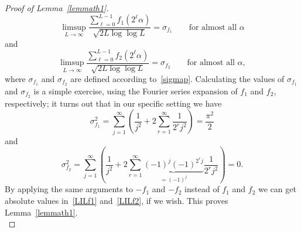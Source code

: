 \documentclass[12pt]{amsart}
\begin{document}
\begin{proof}[Proof of Lemma~\ref{lemmath1}]
\begin{equation} \label{LILf1}
\limsup_{L \to \infty} \frac{\sum_{\ell=0}^{L-1} f_1(2^\ell \alpha)}{\sqrt{2 L \log \log L}} = \sigma_{f_1} \qquad \textrm{for almost all $\alpha$}
\end{equation}
and
\begin{equation} \label{LILf2}
\limsup_{L \to \infty} \frac{\sum_{\ell=0}^{L-1} f_2(2^\ell \alpha)}{\sqrt{2 L \log \log L}} = \sigma_{f_2} \qquad \textrm{for almost all $\alpha$},
\end{equation}
where $\sigma_{f_1}$ and $\sigma_{f_2}$ are defined according to~\eqref{sigmap}. Calculating the values of $\sigma_{f_1}$ and $\sigma_{f_2}$ is a simple exercise, using the Fourier series expansion of $f_1$ and $f_2$, respectively; it turns out that in our specific setting we have
\begin{equation} \label{LILf3}
\sigma_{f_1}^2 = \sum_{j=1}^{\infty} \left(\frac{1}{j^2} + 2 \sum_{r=1}^\infty \frac{1}{2^r j^2}\right) = \frac{\pi^2}{2}
\end{equation}
and
\begin{equation} \label{LILf4}
\sigma_{f_2}^2 = \sum_{j=1}^{\infty} \left(\frac{1}{j^2} + 2 \sum_{r=1}^\infty \underbrace{(-1)^j (-1)^{2^r j}}_{=(-1)^j} \frac{1}{2^r j^2}\right) = 0.
\end{equation} 
By applying the same arguments to $-f_1$ and $-f_2$ instead of $f_1$ and $f_2$ we can get absolute values in~\eqref{LILf1} and~\eqref{LILf2}, if we wish. This proves Lemma~\ref{lemmath1}.\\
\end{proof}
\end{document}
